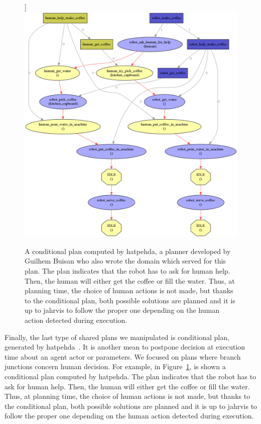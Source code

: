 \documentclass[a4paper,11pt,twoside]{StyleThese}
\begin{document}
\begin{figure}[!htb]]
	\centering
	\includegraphics[width=\linewidth]{figures/chapter2/cond_plan_coffee.png}
	\caption{A conditional plan computed by \acrshort{hatpehda}, a planner developed by Guilhem Buisan who also wrote the domain which served for this plan. The plan indicates that the robot has to ask for human help. Then, the human will either get the coffee or fill the water. Thus, at planning time, the choice of human actions is not made, but thanks to the conditional plan, both possible solutions are planned and it is up to \acrshort{jahrvis} to follow the proper one depending on the human action detected during execution.}
	\label{chap2:fig:cond_plan_coffee}
\end{figure}

Finally, the last type of shared plans we manipulated is conditional plan, generated by \acrfull{hatpehda}~\cite{buisan_2021_human}. It is another mean to postpone decision at execution time about an agent actor or parameters. We focused on plans where branch junctions concern human decision. For example, in Figure~\ref{chap2:fig:cond_plan_coffee}, is shown a conditional plan computed by \acrshort{hatpehda}. The plan indicates that the robot has to ask for human help. Then, the human will either get the coffee or fill the water. Thus, at planning time, the choice of human actions is not made, but thanks to the conditional plan, both possible solutions are planned and it is up to \acrshort{jahrvis} to follow the proper one depending on the human action detected during execution.
\end{document}
